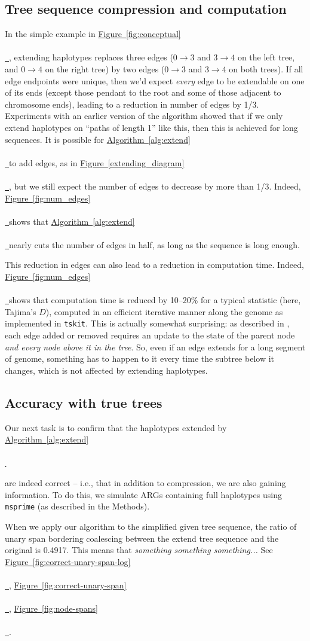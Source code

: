 \documentclass[10pt,twoside,lineno]{gsajnl}
\newcommand{\tskit}{\texttt{tskit}}
\newcommand{\msprime}{\texttt{msprime}}
\newcommand{\comment}[1]{{\color{violet} \it #1}}
\newcommand{\algorithmref}[2][]{%
	\hyperref[{#2}]{%
		Algorithm~\ref*{#2}%
		\ifx\\#1\\%
		\else
		\,#1%
		\fi
	}%
}
\newcommand*{\figref}[2][]{%
	\hyperref[{#2}]{%
		Figure~\ref*{#2}%
		\ifx\\#1\\%
		\else
		\,#1%
		\fi
	}%
}
\begin{document}
\subsection{Tree sequence compression and computation}

In the simple example in \figref{fig:conceptual},
extending haplotypes replaces three edges
($0 \to 3$ and $3 \to 4$ on the left tree, and $0 \to 4$ on the right tree)
by two edges ($0 \to 3$ and $3 \to 4$ on both trees).
If all edge endpoints were unique, then we'd expect \emph{every} edge to be extendable
on one of its ends
(except those pendant to the root and some of those adjacent to chromosome ends),
leading to a reduction in number of edges by 1/3.
Experiments with an earlier version of the algorithm showed that
if we only extend haplotypes on ``paths of length 1'' like this, 
then this is achieved for long sequences.
It is possible for \algorithmref{alg:extend} to add edges, as in \figref{extending_diagram},
but we still expect the number of edges to decrease by more than 1/3.
Indeed,
\figref{fig:num_edges} shows that \algorithmref{alg:extend} nearly cuts the number of edges
in half, as long as the sequence is long enough.

This reduction in edges can also lead to a reduction in computation time.
Indeed, \figref{fig:num_edges} shows that computation time is reduced by 10--20\%
for a typical statistic (here, Tajima's $D$),
computed in an efficient iterative manner along the genome as implemented in \tskit.
This is actually somewhat surprising:
as described in \citet{ralph2020efficiently},
each edge added or removed requires an update
to the state of the parent node \emph{and every node above it in the tree}.
So, even if an edge extends for a long segment of genome,
something has to happen to it every time the subtree below it changes,
which is not affected by extending haplotypes.

\subsection{Accuracy with true trees}

Our next task is to confirm that the haplotypes extended by \algorithmref{alg:extend}
are indeed correct -- i.e., that in addition to compression, we are also gaining information.
To do this, we simulate ARGs containing full haplotypes using \msprime{}
(as described in the Methods).

When we apply our algorithm to the simplified given tree sequence, the ratio of unary span bordering coalescing between the extend tree sequence and the original is 0.4917. This means that \comment{something something something...}  
See \figref{fig:correct-unary-span-log}, \figref{fig:correct-unary-span}, \figref{fig:node-spans}.
\end{document}
